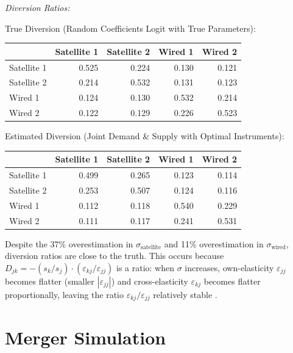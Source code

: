 \documentclass[english,11pt]{article}
\begin{document}
\begin{enumerate}
\textit{Diversion Ratios:}

True Diversion (Random Coefficients Logit with True Parameters):
\begin{center}
\begin{tabular}{lrrrr}
\hline
 & Satellite 1 & Satellite 2 & Wired 1 & Wired 2 \\
\hline
Satellite 1 & 0.525 & 0.224 & 0.130 & 0.121 \\
Satellite 2 & 0.214 & 0.532 & 0.131 & 0.123 \\
Wired 1 & 0.124 & 0.130 & 0.532 & 0.214 \\
Wired 2 & 0.122 & 0.129 & 0.226 & 0.523 \\
\hline
\end{tabular}
\end{center}

Estimated Diversion (Joint Demand \& Supply with Optimal Instruments):
\begin{center}
\begin{tabular}{lrrrr}
\hline
 & Satellite 1 & Satellite 2 & Wired 1 & Wired 2 \\
\hline
Satellite 1 & 0.499 & 0.265 & 0.123 & 0.114 \\
Satellite 2 & 0.253 & 0.507 & 0.124 & 0.116 \\
Wired 1 & 0.112 & 0.118 & 0.540 & 0.229 \\
Wired 2 & 0.111 & 0.117 & 0.241 & 0.531 \\
\hline
\end{tabular}
\end{center}

Despite the 37\% overestimation in $\sigma_{\text{satellite}}$ and 11\% overestimation in $\sigma_{\text{wired}}$, diversion ratios are close to the truth. This occurs because $D_{jk} = -(s_k/s_j) \cdot (\varepsilon_{kj}/\varepsilon_{jj})$ is a ratio: when $\sigma$ increases, own-elasticity $\varepsilon_{jj}$ becomes flatter (smaller $|\varepsilon_{jj}|$) and cross-elasticity $\varepsilon_{kj}$ becomes flatter proportionally, leaving the ratio $\varepsilon_{kj}/\varepsilon_{jj}$ relatively stable \citep{conlon2021diversion}.


\end{enumerate}


\section{Merger Simulation}
\end{document}
